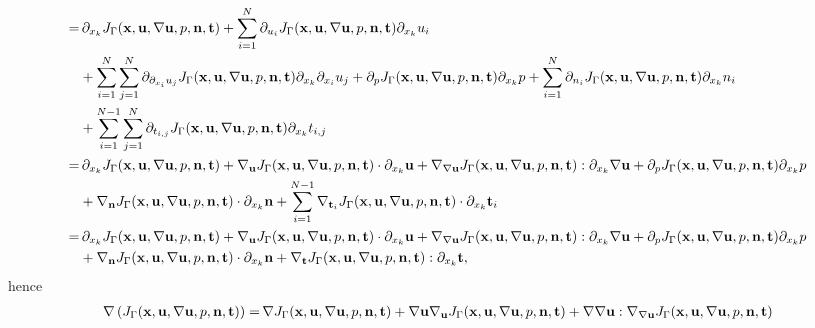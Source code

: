 \documentclass[oneside,11pt]{book}
\numberwithin{equation}{section}
\begin{document}
\begin{enumerate}[leftmargin=0in]
\begin{align*}
        =&\, \partial_{x_k}J_\Gamma({\bf x},{\bf u},\nabla{\bf u},p,{\bf n},{\bf t}) + \sum_{i=1}^N \partial_{u_i}J_\Gamma({\bf x},{\bf u},\nabla{\bf u},p,{\bf n},{\bf t})\partial_{x_k}u_i\\
        &+ \sum_{i=1}^N\sum_{j=1}^N \partial_{\partial_{x_i}u_j}J_\Gamma({\bf x},{\bf u},\nabla{\bf u},p,{\bf n},{\bf t})\partial_{x_k}\partial_{x_i}u_j + \partial_pJ_\Gamma({\bf x},{\bf u},\nabla{\bf u},p,{\bf n},{\bf t})\partial_{x_k}p + \sum_{i=1}^N \partial_{n_i}J_\Gamma({\bf x},{\bf u},\nabla{\bf u},p,{\bf n},{\bf t})\partial_{x_k}n_i\\
        &+ \sum_{i=1}^{N-1}\sum_{j=1}^N \partial_{t_{i,j}}J_\Gamma({\bf x},{\bf u},\nabla{\bf u},p,{\bf n},{\bf t})\partial_{x_k}t_{i,j}\\
        =&\, \partial_{x_k}J_\Gamma({\bf x},{\bf u},\nabla{\bf u},p,{\bf n},{\bf t}) + \nabla_{\bf u}J_\Gamma({\bf x},{\bf u},\nabla{\bf u},p,{\bf n},{\bf t})\cdot\partial_{x_k}{\bf u} + \nabla_{\nabla{\bf u}}J_\Gamma({\bf x},{\bf u},\nabla{\bf u},p,{\bf n},{\bf t}):\partial_{x_k}\nabla{\bf u} + \partial_pJ_\Gamma({\bf x},{\bf u},\nabla{\bf u},p,{\bf n},{\bf t})\partial_{x_k}p\\
        &+ \nabla_{\bf n}J_\Gamma({\bf x},{\bf u},\nabla{\bf u},p,{\bf n},{\bf t})\cdot\partial_{x_k}{\bf n} + \sum_{i=1}^{N-1} \nabla_{{\bf t}_i}J_\Gamma({\bf x},{\bf u},\nabla{\bf u},p,{\bf n},{\bf t})\cdot\partial_{x_k}{\bf t}_i\\
        =&\, \partial_{x_k}J_\Gamma({\bf x},{\bf u},\nabla{\bf u},p,{\bf n},{\bf t}) + \nabla_{\bf u}J_\Gamma({\bf x},{\bf u},\nabla{\bf u},p,{\bf n},{\bf t})\cdot\partial_{x_k}{\bf u} + \nabla_{\nabla{\bf u}}J_\Gamma({\bf x},{\bf u},\nabla{\bf u},p,{\bf n},{\bf t}):\partial_{x_k}\nabla{\bf u} + \partial_pJ_\Gamma({\bf x},{\bf u},\nabla{\bf u},p,{\bf n},{\bf t})\partial_{x_k}p\\
        &+ \nabla_{\bf n}J_\Gamma({\bf x},{\bf u},\nabla{\bf u},p,{\bf n},{\bf t})\cdot\partial_{x_k}{\bf n} + \nabla_{\bf t}J_\Gamma({\bf x},{\bf u},\nabla{\bf u},p,{\bf n},{\bf t}):\partial_{x_k}{\bf t},
    \end{align*}
    hence
    \begin{align*}
        \nabla\left(J_\Gamma({\bf x},{\bf u},\nabla{\bf u},p,{\bf n},{\bf t})\right) =&\, \nabla J_\Gamma({\bf x},{\bf u},\nabla{\bf u},p,{\bf n},{\bf t}) + \nabla{\bf u}\nabla_{\bf u}J_\Gamma({\bf x},{\bf u},\nabla{\bf u},p,{\bf n},{\bf t}) + \nabla\nabla{\bf u}:\nabla_{\nabla{\bf u}}J_\Gamma({\bf x},{\bf u},\nabla{\bf u},p,{\bf n},{\bf t})\\

\end{align*}
\end{enumerate}
\end{document}
